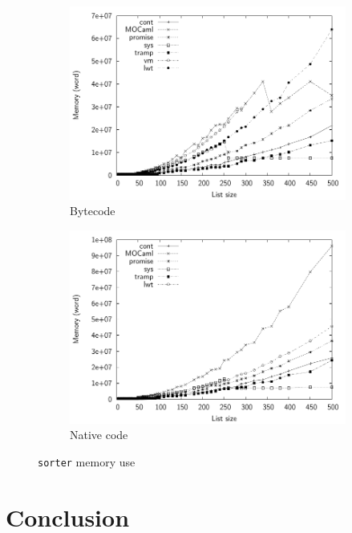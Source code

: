 \documentclass[12pt,twoside,notitlepage]{report}
\theoremstyle{plain}%
\theoremstyle{definition}
\theoremstyle{remark}
\begin{document}
\begin{figure}[h]
\centering
\begin{subfigure}[b]{0.8\linewidth}
\includegraphics[width=\linewidth]{./sorter_mem_bw}
\caption{Bytecode}
\label{fig:sorter_mem_bc}
\end{subfigure}
\begin{subfigure}[b]{0.8\linewidth}
\includegraphics[width=\linewidth]{./sorter_mem_opt_bw}
\caption{Native code}
\label{fig:sorter_mem_nat}
\end{subfigure}
\cprotect\caption{\verb|sorter| memory use}
\label{fig:sorter_mem}
\end{figure}



\cleardoublepage
\chapter{Conclusion}
\end{document}
